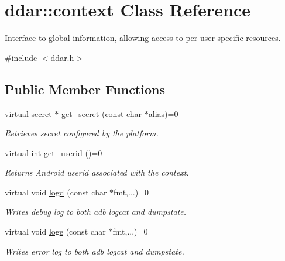 \hypertarget{classddar_1_1context}{\section{ddar\-:\-:context \-Class \-Reference}
\label{classddar_1_1context}
}


\-Interface to global information, allowing access to per-\/user specific resources.  




{\ttfamily \#include $<$ddar.\-h$>$}

\subsection*{\-Public \-Member \-Functions}
\begin{DoxyCompactItemize}
\item 
\hypertarget{classddar_1_1context_aa2d2b29bd88712c4e6fc256ee81d0674}{virtual \hyperlink{classddar_1_1secret}{secret} $\ast$ \hyperlink{classddar_1_1context_aa2d2b29bd88712c4e6fc256ee81d0674}{get\-\_\-secret} (const char $\ast$alias)=0}\label{classddar_1_1context_aa2d2b29bd88712c4e6fc256ee81d0674}

\begin{DoxyCompactList}\small\item\em \-Retrieves secret configured by the platform. \end{DoxyCompactList}\item 
\hypertarget{classddar_1_1context_a5cfc2fb73a963fa5bd1e423b97a06f71}{virtual int \hyperlink{classddar_1_1context_a5cfc2fb73a963fa5bd1e423b97a06f71}{get\-\_\-userid} ()=0}\label{classddar_1_1context_a5cfc2fb73a963fa5bd1e423b97a06f71}

\begin{DoxyCompactList}\small\item\em \-Returns \-Android userid associated with the context. \end{DoxyCompactList}\item 
\hypertarget{classddar_1_1context_a355ee83edd53a41e43b3282652bab12d}{virtual void \hyperlink{classddar_1_1context_a355ee83edd53a41e43b3282652bab12d}{logd} (const char $\ast$fmt,...)=0}\label{classddar_1_1context_a355ee83edd53a41e43b3282652bab12d}

\begin{DoxyCompactList}\small\item\em \-Writes debug log to both adb logcat and dumpstate. \end{DoxyCompactList}\item 
\hypertarget{classddar_1_1context_a8b3c6806de576d996aa2b51bf52ddc77}{virtual void \hyperlink{classddar_1_1context_a8b3c6806de576d996aa2b51bf52ddc77}{loge} (const char $\ast$fmt,...)=0}\label{classddar_1_1context_a8b3c6806de576d996aa2b51bf52ddc77}

\begin{DoxyCompactList}\small\item\em \-Writes error log to both adb logcat and dumpstate. \end{DoxyCompactList}\end{DoxyCompactItemize}


